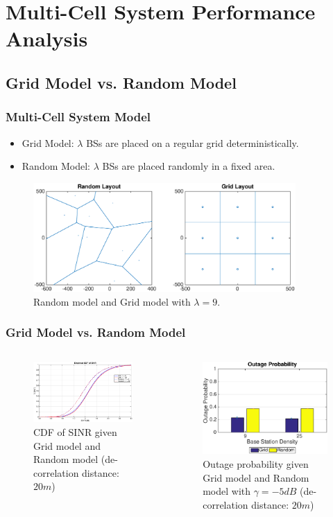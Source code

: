 \documentclass{beamer}
\begin{document}
\section{Multi-Cell System Performance Analysis}
\subsection{Grid Model vs. Random Model}
\begin{frame}
\frametitle{Multi-Cell System Model}
\begin{itemize}
 \item Grid Model: $\lambda$ BSs are placed on a regular grid deterministically.
 \item Random Model: $\lambda$ BSs are placed randomly in a fixed area.
\end{itemize}
 \begin{figure}
 \centering
 \includegraphics[width=10cm]{systemLayout.eps}
 \caption{Random model and Grid model with $\lambda = 9$.}
 \end{figure}
\end{frame}
\begin{frame}
\frametitle{Grid Model vs. Random Model}
\begin{columns}[c]
 \begin{figure}
 \centering
 \includegraphics[width=6cm]{GridVSRandom.eps}
 \caption{CDF of SINR given Grid model and Random model (de-correlation distance: $20m$)}
 \label{4:cdf1}
 \end{figure}
 \begin{figure}
 \centering
 \includegraphics[width=6cm]{OutageProbGridVSRandom.eps}
 \caption{Outage probability given Grid model and Random model with $\gamma = -5dB$ (de-correlation distance: $20m$)}
 \label{4:outage1}
 \end{figure}
 \end{columns}
\end{frame}
\end{document}
